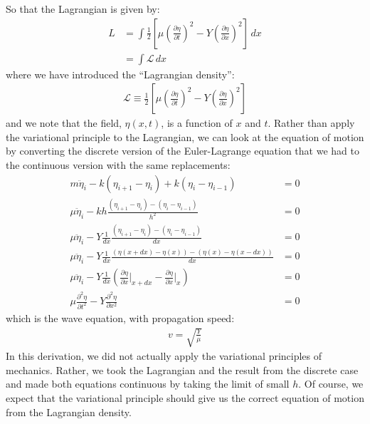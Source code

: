 So that the Lagrangian is given by:
\begin{align}
L&=\int \frac{1}{2}\left[\mu\left(\frac{\partial\eta}{\partial t}\right)^2-Y\left(\frac{\partial\eta}{\partial x}\right)^2\right]\,dx\nonumber\\
&=\int \mathcal{L} \,dx
\end{align}
where we have introduced the ``Lagrangian density'':
\begin{align}
\mathcal{L}\equiv\frac{1}{2}\left[\mu\left(\frac{\partial\eta}{\partial t}\right)^2-Y\left(\frac{\partial\eta}{\partial x}\right)^2\right]
\end{align}
and we note that the field, $\eta(x,t)$, is a function of $x$ and $t$. Rather than apply the variational principle to the Lagrangian, we can look at the equation of motion by converting the discrete version of the Euler-Lagrange equation that we had to the continuous version with the same replacements:
\begin{align}
m\ddot\eta_i-k(\eta_{i+1}-\eta_i)+k(\eta_i-\eta_{i-1})&=0\nonumber\\
\mu\ddot\eta_i-kh\frac{(\eta_{i+1}-\eta_i)-(\eta_i-\eta_{i-1})}{h^2}&=0\nonumber\\
\mu\ddot\eta_i-Y\frac{1}{dx}\frac{(\eta_{i+1}-\eta_i)-(\eta_i-\eta_{i-1})}{dx}&=0\nonumber\\
\mu\ddot\eta_i-Y\frac{1}{dx}\frac{(\eta(x+dx)-\eta(x))-(\eta(x)-\eta(x-dx))}{dx}&=0\nonumber\\
\mu\ddot\eta_i-Y\frac{1}{dx}\left(\frac{\partial\eta}{\partial x}\bigr\rvert_{x+dx}-\frac{\partial\eta}{\partial x}\bigr\rvert_x\right)&=0\nonumber\\
\mu\frac{\partial^2\eta}{\partial t^2}-Y\frac{\partial^2\eta}{\partial x^2}&=0
\end{align}
which is the wave equation, with propagation speed:
\begin{align}
v=\sqrt{\frac{Y}{\mu}}
\end{align}
In this derivation, we did not actually apply the variational principles of mechanics. Rather, we took the Lagrangian and the result from the discrete case and made both equations continuous by taking the limit of small $h$. Of course, we expect that the variational principle should give us the correct equation of motion  from the Lagrangian density. 

